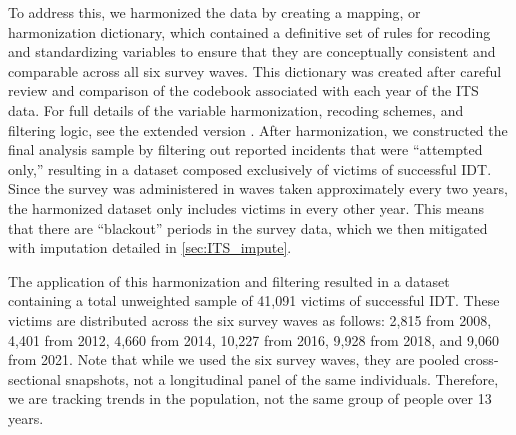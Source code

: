 To address this, we harmonized the data by creating a mapping, or harmonization dictionary, which contained a definitive set of rules for recoding and standardizing variables to ensure that they are conceptually consistent and comparable across all six survey waves. This dictionary was created after careful review and comparison of the codebook associated with each year of the ITS data. For full details of the variable harmonization, recoding schemes, and filtering logic, see the extended version \cite{Anonymous2026SocialCostExtended}. After harmonization, we constructed the final analysis sample by filtering out reported incidents that were ``attempted only,'' resulting in a dataset composed exclusively of victims of successful IDT.
Since the survey was administered in waves taken approximately every two years, the harmonized dataset only includes victims in every other year. This means that there are ``blackout'' periods in the survey data, which we then mitigated with imputation detailed  in \ref{sec:ITS_impute}.

The application of this harmonization and filtering resulted in a dataset containing a total unweighted sample of 41,091 victims of successful IDT. These victims are distributed across the six survey waves as follows: 2,815 from 2008, 4,401 from 2012, 4,660 from 2014, 10,227 from 2016, 9,928 from 2018, and 9,060 from 2021. 
Note that while we used the six survey waves, they are pooled cross-sectional snapshots, not a longitudinal panel of the same individuals. Therefore, we are tracking trends in the population, not the same group of people over 13 years.

